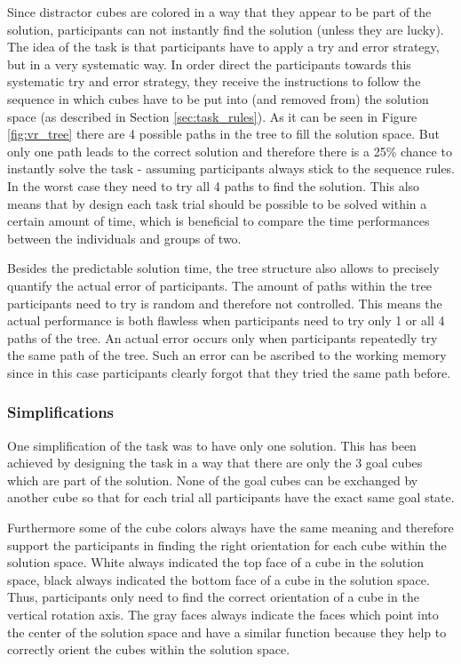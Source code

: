 Since distractor cubes are colored in a way that they appear to be part of the solution, participants can not instantly find the solution (unless they are lucky). The idea of the task is that participants have to apply a try and error strategy, but in a very systematic way. In order direct the participants towards this systematic try and error strategy, they receive the instructions to follow the sequence in which cubes have to be put into (and removed from) the solution space (as described in Section \ref{sec:task_rules}). As it can be seen in Figure \ref{fig:vr_tree} there are 4 possible paths in the tree to fill the solution space. But only one path leads to the correct solution and therefore there is a 25\% chance to instantly solve the task - assuming participants always stick to the sequence rules. In the worst case they need to try all 4 paths to find the solution. This also means that by design each task trial should be possible to be solved within a certain amount of time, which is beneficial to compare the time performances between the individuals and groups of two. 

Besides the predictable solution time, the tree structure also allows to precisely quantify the actual error of participants. The amount of paths within the tree participants need to try is random and therefore not controlled. This means the actual performance is both flawless when participants need to try only 1 or all 4 paths of the tree. An actual error occurs only when participants repeatedly try the same path of the tree. Such an error can be ascribed to the working memory since in this case participants clearly forgot that they tried the same path before.

\subsubsection{Simplifications}
One simplification of the task was to have only one solution. This has been achieved by designing the task in a way that there are only the 3 goal cubes which are part of the solution. None of the goal cubes can be exchanged by another cube so that for each trial all participants have the exact same goal state.

Furthermore some of the cube colors always have the same meaning and therefore support the participants in finding the right orientation for each cube within the solution space. White always indicated the top face of a cube in the solution space, black always indicated the bottom face of a cube in the solution space. Thus, participants only need to find the correct orientation of a cube in the vertical rotation axis. The gray faces always indicate the faces which point into the center of the solution space and have a similar function because they help to correctly orient the cubes within the solution space.

